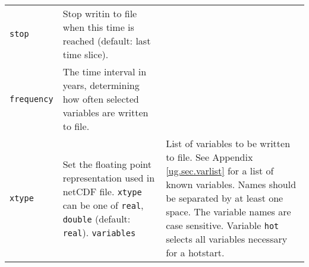 \begin{center}
\begin{supertabular*}{\textwidth}{@{\extracolsep{\fill}}|l|p{11cm}|}
    \texttt{stop} & Stop writin to file when this time is reached (default: last time slice). \\
    \texttt{frequency} & The time interval in years, determining how often selected variables are written to file.\\
    \texttt{xtype} & Set the floating point representation used in netCDF file. \texttt{xtype} can be one of \texttt{real}, \texttt{double} (default: \texttt{real}).
    \texttt{variables} & List of variables to be written to file. See Appendix \ref{ug.sec.varlist} for a list of known variables. Names should be separated by at least one space. The variable names are case sensitive. Variable \texttt{hot} selects all variables necessary for a hotstart.\\
    \hline
  \end{supertabular*}
\end{center}
